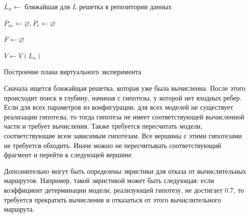 \begin{algorithm}


    $L_{n} \gets $ ближайшая для $L$ решетка в репозитории данных

    $P_{ne} \gets \varnothing , P_{e} \gets \varnothing $ 

    $F \gets \varnothing $

    $V \gets V(L_n)$

        
    \caption{Построение плана виртуального эксперимента}\label{alg:plan}
\end{algorithm}

Сначала ищется ближайщая решетка, которая уже была вычисленна. После этого происходит поиск в глубину, начиная с 
гипотезы, у которой нет входных ребер. Если для всех параметров из конфигурации, для всех моделей не существует 
реализации гипотезы, то тогда гипотеза не имеет соответствующей вычисленной части и требует вычисления. Также 
требуется пересчитать модели, соответствующие всем зависимым гипотезам. Все вершины с этими гипотезами 
не требуется обходить. Иначе можно не пересчитывать соответствующий фрагмент и перейти к следующей вершине. 

Дополнительно могут быть определены эвристики для отказа от вычислительных маршрутов. Например, такой эвристикой может 
быть следующая: если коэффициент детерминации модели, реализующей гипотезу, не достигает 0.7, то требуется прекратить
вычисления и отказаться от этого вычислительного маршрута.

